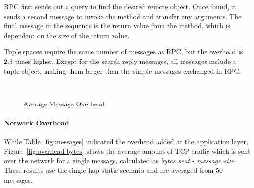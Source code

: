 \documentclass[lnicst]{svmultln}
\begin{document}
RPC first sends out a query to find the desired remote object. Once found, it sends a second message to invoke the method and transfer any arguments. The final message in the sequence is the return value from the method, which is dependent on the size of the return value.


Tuple spaces require the same number of messages as RPC, but the overhead is 2.3 times higher. Except for the search reply messages, all messages include a tuple object, making them larger than the simple messages exchanged in RPC.


\begin{figure}
\centering
\mbox {
}
\caption{Average Message Overhead}
\end{figure}


\paragraph{Network Overhead}

While Table~\ref{fig:messages} indicated the overhead added at the application layer, Figure~\ref{fig:overhead-bytes} shows the average amount of TCP traffic which is sent over the network for a single message, calculated as \textit{bytes sent} - \textit{message size}. These results use the single hop static scenario and are averaged from 50 messages.
\end{document}
